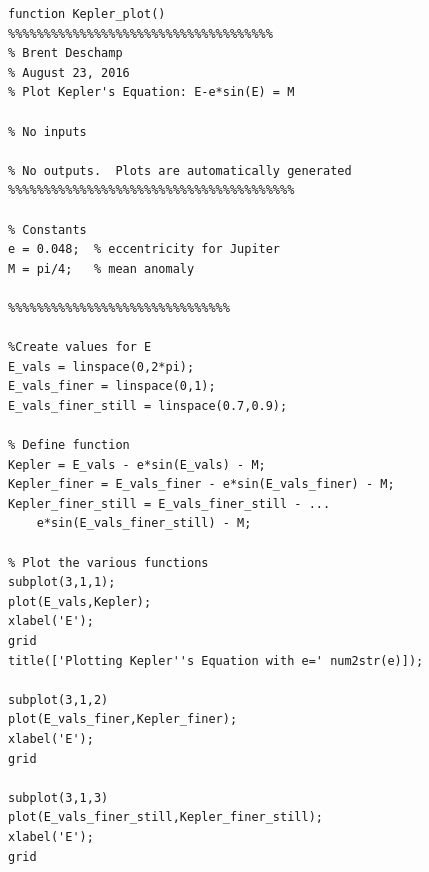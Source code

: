 \documentclass[11pt]{article}
\begin{document}
\begin{lstlisting}[caption={MATLAB code for plotting Kepler's equation.}, label={code:plot}, frame=tb]
function Kepler_plot()
%%%%%%%%%%%%%%%%%%%%%%%%%%%%%%%%%%%%%
% Brent Deschamp
% August 23, 2016
% Plot Kepler's Equation: E-e*sin(E) = M

% No inputs

% No outputs.  Plots are automatically generated
%%%%%%%%%%%%%%%%%%%%%%%%%%%%%%%%%%%%%%%%

% Constants
e = 0.048;  % eccentricity for Jupiter
M = pi/4;   % mean anomaly

%%%%%%%%%%%%%%%%%%%%%%%%%%%%%%%

%Create values for E
E_vals = linspace(0,2*pi);
E_vals_finer = linspace(0,1);
E_vals_finer_still = linspace(0.7,0.9);

% Define function
Kepler = E_vals - e*sin(E_vals) - M;
Kepler_finer = E_vals_finer - e*sin(E_vals_finer) - M;
Kepler_finer_still = E_vals_finer_still - ...
	e*sin(E_vals_finer_still) - M;

% Plot the various functions
subplot(3,1,1);
plot(E_vals,Kepler);
xlabel('E');
grid
title(['Plotting Kepler''s Equation with e=' num2str(e)]);

subplot(3,1,2)
plot(E_vals_finer,Kepler_finer);
xlabel('E');
grid

subplot(3,1,3)
plot(E_vals_finer_still,Kepler_finer_still);
xlabel('E');
grid
\end{lstlisting}



\end{document}
